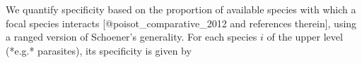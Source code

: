 We quantify specificity based on the proportion of available species with
which a focal species interacts [@poisot_comparative_2012 and references
therein], using a ranged version of Schoener's generality. For each species
$i$ of the upper level (*e.g.* parasites), its specificity is given by
